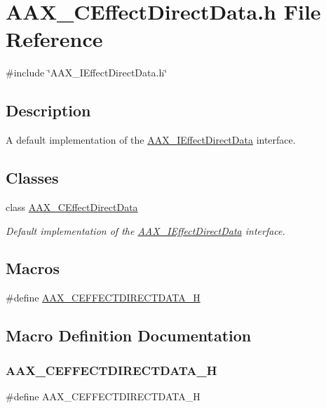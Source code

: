 \hypertarget{a00422}{}\section{A\+A\+X\+\_\+\+C\+Effect\+Direct\+Data.\+h File Reference}
\label{a00422}
{\ttfamily \#include \char`\"{}A\+A\+X\+\_\+\+I\+Effect\+Direct\+Data.\+h\char`\"{}}\newline


\subsection{Description}
A default implementation of the \mbox{\hyperlink{a01817}{A\+A\+X\+\_\+\+I\+Effect\+Direct\+Data}} interface. 

\subsection*{Classes}
\begin{DoxyCompactItemize}
\item 
class \mbox{\hyperlink{a01473}{A\+A\+X\+\_\+\+C\+Effect\+Direct\+Data}}
\begin{DoxyCompactList}\small\item\em Default implementation of the \mbox{\hyperlink{a01817}{A\+A\+X\+\_\+\+I\+Effect\+Direct\+Data}} interface. \end{DoxyCompactList}\end{DoxyCompactItemize}
\subsection*{Macros}
\begin{DoxyCompactItemize}
\item 
\#define \mbox{\hyperlink{a00422_a2f5665c1c3258dde09787cfdd58ad520}{A\+A\+X\+\_\+\+C\+E\+F\+F\+E\+C\+T\+D\+I\+R\+E\+C\+T\+D\+A\+T\+A\+\_\+H}}
\end{DoxyCompactItemize}


\subsection{Macro Definition Documentation}
\mbox{\label{a00422_a2f5665c1c3258dde09787cfdd58ad520}} 
\subsubsection{\texorpdfstring{AAX\_CEFFECTDIRECTDATA\_H}{AAX\_CEFFECTDIRECTDATA\_H}}
{\footnotesize\ttfamily \#define A\+A\+X\+\_\+\+C\+E\+F\+F\+E\+C\+T\+D\+I\+R\+E\+C\+T\+D\+A\+T\+A\+\_\+H}

